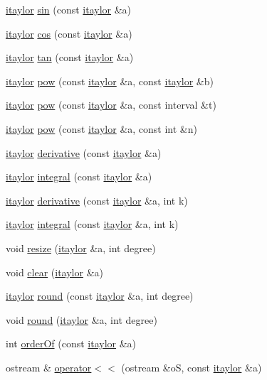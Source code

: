 \begin{DoxyCompactItemize}
\hyperlink{classitaylor}{itaylor} \hyperlink{classitaylor_aa120810b0216f92d8b7bb709fe4c8df2}{sin} (const \hyperlink{classitaylor}{itaylor} \&a)
\item 
\hyperlink{classitaylor}{itaylor} \hyperlink{classitaylor_a863fa25a09ba4d108b624023f714fabc}{cos} (const \hyperlink{classitaylor}{itaylor} \&a)
\item 
\hyperlink{classitaylor}{itaylor} \hyperlink{classitaylor_a1e89188d7c9f76e761e3a80574493169}{tan} (const \hyperlink{classitaylor}{itaylor} \&a)
\item 
\hyperlink{classitaylor}{itaylor} \hyperlink{classitaylor_add6a2dee94153503acc03c051014f863}{pow} (const \hyperlink{classitaylor}{itaylor} \&a, const \hyperlink{classitaylor}{itaylor} \&b)
\item 
\hyperlink{classitaylor}{itaylor} \hyperlink{classitaylor_a8865a7478d3d024024ac9c237ff05b4d}{pow} (const \hyperlink{classitaylor}{itaylor} \&a, const interval \&t)
\item 
\hyperlink{classitaylor}{itaylor} \hyperlink{classitaylor_adfae79e43a063e2db1e109d1126e3319}{pow} (const \hyperlink{classitaylor}{itaylor} \&a, const int \&n)
\item 
\hyperlink{classitaylor}{itaylor} \hyperlink{classitaylor_a926643d40976e4eeb33f69598b35b8cf}{derivative} (const \hyperlink{classitaylor}{itaylor} \&a)
\item 
\hyperlink{classitaylor}{itaylor} \hyperlink{classitaylor_ac4891b459b32f3442e9b5200c2bd5e0b}{integral} (const \hyperlink{classitaylor}{itaylor} \&a)
\item 
\hyperlink{classitaylor}{itaylor} \hyperlink{classitaylor_ac4815c39ce987d7ab15e04240650d720}{derivative} (const \hyperlink{classitaylor}{itaylor} \&a, int k)
\item 
\hyperlink{classitaylor}{itaylor} \hyperlink{classitaylor_ab46914e40a1c404067ac6d2ca48d46a2}{integral} (const \hyperlink{classitaylor}{itaylor} \&a, int k)
\item 
void \hyperlink{classitaylor_ad34de0d71513c5745f9edea5dbb7bbdf}{resize} (\hyperlink{classitaylor}{itaylor} \&a, int degree)
\item 
void \hyperlink{classitaylor_a2524c8f0db7471b13d0cd5e1aa785b40}{clear} (\hyperlink{classitaylor}{itaylor} \&a)
\item 
\hyperlink{classitaylor}{itaylor} \hyperlink{classitaylor_a1e6e019f776d845fb77bcdb183f98596}{round} (const \hyperlink{classitaylor}{itaylor} \&a, int degree)
\item 
void \hyperlink{classitaylor_a7e12f72c00d845d084279a3a66f3f341}{round} (\hyperlink{classitaylor}{itaylor} \&a, int degree)
\item 
int \hyperlink{classitaylor_a4132ecfd27a2b1283feb9f4f30e28c2b}{order\-Of} (const \hyperlink{classitaylor}{itaylor} \&a)
\item 
ostream \& \hyperlink{classitaylor_a0ad0ae441a5e94248ca15e0d92e9c73a}{operator$<$$<$} (ostream \&o\-S, const \hyperlink{classitaylor}{itaylor} \&a)
\end{DoxyCompactItemize}


